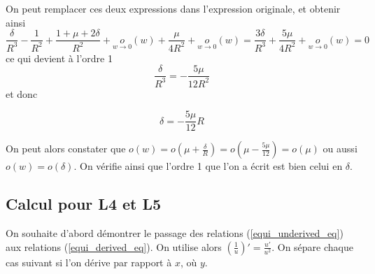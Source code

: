\documentclass[12pt]{article}
\begin{document}
	On peut remplacer ces deux expressions dans l'expression originale, et obtenir ainsi
	\begin{equation*}
		\frac{\delta}{R^3} - \frac{1}{R^2} + \frac{1+\mu+2\delta}{R^2} + \underset{w \to 0}{o}(w) + \frac{\mu}{4R^2} + \underset{w \to 0}{o}(w)
		= \frac{3\delta}{R^3} + \frac{5\mu}{4R^2} + \underset{w \to 0}{o}(w) = 0
	\end{equation*}
	ce qui devient à l'ordre 1
	\begin{equation*}
		\frac{\delta}{R^3} = -\frac{5\mu}{12R^2}
	\end{equation*}
	et donc
	\begin{tcolorbox}[colframe=black,boxrule=0.8pt,colback=white]
		\begin{equation*}
			\delta = - \frac{5\mu}{12}R
		\end{equation*}
	\end{tcolorbox}
	
	On peut alors constater que $o(w) = o(\mu + \frac{\delta}{R}) = o(\mu - \frac{5\mu}{12}) = o(\mu)$ ou aussi $o(w) = o(\delta)$. On vérifie ainsi que l'ordre 1 que l'on a écrit est bien celui en $\delta$.
	
	
	\clearpage
	\subsection*{Calcul pour L4 et L5}
	On souhaite d'abord démontrer le passage des relations (\ref{equi_underived_eq}) aux relations (\ref{equi_derived_eq}). On utilise alors $(\frac{1}{u})' = \frac{u'}{u^2}$. On sépare chaque cas suivant si l'on dérive par rapport à $x$, où $y$.	
	\\
	
\end{document}
